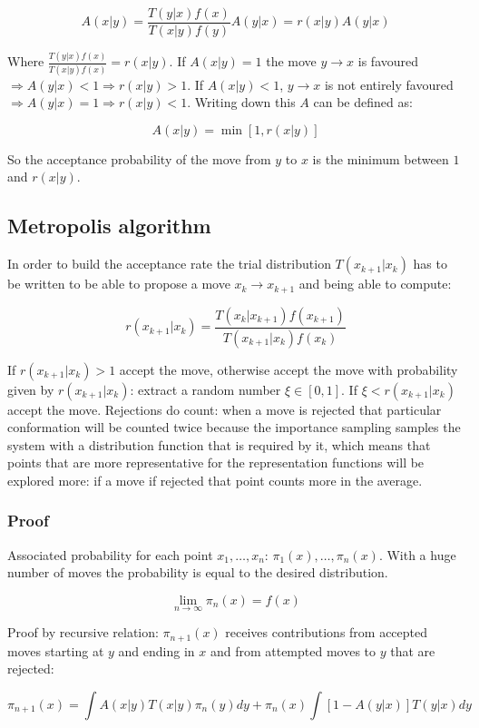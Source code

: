 	$$A(x|y) = \frac{T(y|x)f(x)}{T(x|y)f(y)}A(y|x) = r(x|y)A(y|x)$$

	Where $\frac{T(y|x)f(x)}{T(x|y)f(x)} = r(x|y)$.
	If $A(x|y) = 1$ the move $y\rightarrow x$ is favoured $\Rightarrow A(y|x)< 1 \Rightarrow r(x|y)>1$.
	If $A(x|y) < 1$, $y\rightarrow x$ is not entirely favoured $\Rightarrow A(y|x) = 1\Rightarrow r(x|y) < 1$.
	Writing down this $A$ can be defined as:

	$$A(x|y) = \min[1, r(x|y)]$$

	So the acceptance probability of the move from $y$ to $x$ is the minimum between $1$ and $r(x|y)$.

	\subsection{Metropolis algorithm}
	In order to build the acceptance rate the trial distribution $T(x_{k+1}|x_k)$ has to be written to be able to propose a move $x_k\rightarrow x_{k+1}$ and being able to compute:

	$$r(x_{k+1}|x_k) = \frac{T(x_k|x_{k+1})f(x_{k+1})}{T(x_{k+1}|x_k)f(x_k)}$$

	If $r(x_{k+1}|x_k)>1$ accept the move, otherwise accept the move with probability given by $r(x_{k+1}|x_k)$: extract a random number $\xi\in[0,1]$.
	If $\xi< r(x_{k+1}|x_k)$ accept the move.
	Rejections do count: when a move is rejected that particular conformation will be counted twice because the importance sampling samples the system with a distribution function that is required by it, which means that points that are more representative for the representation functions will be explored more: if a move if rejected that point counts more in the average.

		\subsubsection{Proof}
		Associated probability for each point $x_1, \dots, x_n$: $\pi_1(x), \dots, \pi_n(x)$.
		With a huge number of moves the probability is equal to the desired distribution.

		$$\lim\limits_{n\rightarrow\infty}\pi_n(x) = f(x)$$

		Proof by recursive relation: $\pi_{n+1}(x)$ receives contributions from accepted moves starting at $y$ and ending in $x$ and from attempted moves to $y$ that are rejected:

		$$\pi_{n+1}(x) = \int A(x|y)T(x|y)\pi_n(y)dy + \pi_n(x)\int[1-A(y|x)]T(y|x)dy$$

